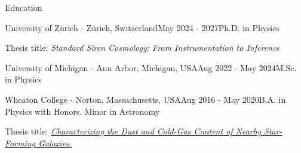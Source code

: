 \documentclass{resume} %
\begin{document}
\begin{rSection}{Education}
    \begin{rSubsection}
        {University of Zürich - Zürich, Switzerland}{May 2024 - 2027}{Ph.D. in Physics}{}
        
        Thesis title: \textit{Standard Siren Cosmology: From Instrumentation to Inference}
    \end{rSubsection}
    
    \begin{rSubsection}
        {University of Michigan - Ann Arbor, Michigan, USA}{Aug 2022 - May 2024}{M.Sc. in Physics}{}
    \end{rSubsection}
        

\begin{rSubsection}{Wheaton College - Norton, Massachusetts, USA}{Aug 2016 - May 2020}{B.A. in Physics with Honors. Minor in Astronomy}{}

    Thesis title: \textit{\href{https://wheatoncollege.as.atlas-sys.com/repositories/2/archival_objects/21957}{Characterizing the Dust and Cold-Gas Content of Nearby Star-Forming Galaxies.}}

\end{rSubsection}


\end{rSection}
\end{document}
